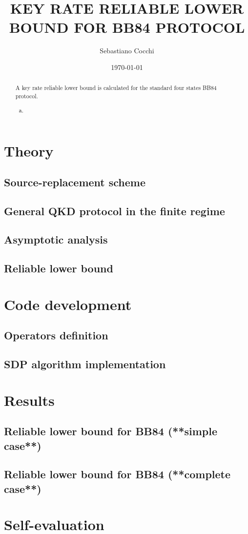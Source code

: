 \documentclass[12]{article}
\title{KEY RATE RELIABLE LOWER BOUND FOR BB84 PROTOCOL}
\author{Sebastiano Cocchi }
\date{\today}
\theoremstyle{definition}
\theoremstyle{remark}
\theoremstyle{example}
\theoremstyle{corollary}
\theoremstyle{lemma}
\begin{document}
\maketitle

\begin{abstract}                %
A key rate reliable lower bound is calculated for the standard four states BB84 protocol.
\begin{enumerate}[(a)]
\item 
\end{enumerate}\end{abstract}

\section{Theory}
 \subsection{Source-replacement scheme}
 \subsection{General QKD protocol in the finite regime}

 \subsection{Asymptotic analysis}

 \subsection{Reliable lower bound}

\section{Code development}
 \subsection{Operators definition}

 \subsection{SDP algorithm implementation}

\section{Results}
 \subsection{Reliable lower bound for BB84 (**simple case**)}

 \subsection{Reliable lower bound for BB84 (**complete case**)}

\section{Self-evaluation}
\end{document}
